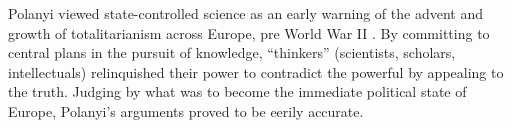 Polanyi viewed state-controlled science as an early warning of the advent and growth of totalitarianism across Europe, pre World War II \citep{polanyi36}. By committing to central plans in the pursuit of knowledge, ``thinkers'' (scientists, scholars, intellectuals) relinquished their power to contradict the powerful by appealing to the truth. Judging by what was to become the immediate political state of Europe, Polanyi's arguments proved to be eerily accurate.

